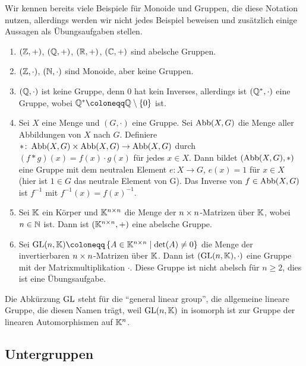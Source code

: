 {Wir kennen bereits viele Beispiele für Monoide und Gruppen, die diese Notation nutzen, allerdings werden wir nicht jedes Beispiel beweisen und zusätzlich einige Aussagen als Übungsaufgaben stellen.

\begin{example}
  \leavevmode \vspace{-\baselineskip}
  \begin{enumerate}
    \item $(\mathbb{Z},+)$, $(\mathbb{Q},+)$, $(\mathbb{R},+)$, $(\mathbb{C},+)$ sind abelsche Gruppen.
    \item $(\mathbb{Z},\cdot)$, $(\mathbb{N},\cdot)$ sind Monoide, aber keine Gruppen.
    \item $(\mathbb{Q},\cdot)$ ist keine Gruppe, denn $0$ hat kein Inverses, allerdings ist $(\mathbb{Q}^*,\cdot)$ eine Gruppe, wobei $\QQ^* \coloneqq \QQ \setminus \setdef{0}$ ist.
    \item Sei $X$ eine Menge und $(G,\cdot)$ eine Gruppe. Sei $\operatorname{Abb}(X,G)$ die Menge aller Abbildungen von $X$ nach $G$. Definiere $* \colon \operatorname{Abb}(X,G) \times \operatorname{Abb}(X,G) \rightarrow \operatorname{Abb}(X,G)$ durch $(f * g)(x) = f(x) \cdot g(x)$ für jedes $x \in X$.
    Dann bildet $(\operatorname{Abb}(X,G),*)$ eine Gruppe mit dem neutralen Element $e \colon X \rightarrow G$, $e(x) = 1$ für $x \in X$ (hier ist $1 \in G$ das neutrale Element von G). Das Inverse von $f \in \operatorname{Abb}(X,G)$ ist $f^{-1}$ mit $f^{-1}(x) = f(x)^{-1}$.
    \item Sei $\mathbb{K}$ ein Körper und $\mathbb{K}^{n \times n}$ die Menge der ${n \times n}$-Matrizen über $\mathbb{K}$, wobei $n \in \mathbb{N}$ ist. Dann ist $(\mathbb{K}^{n \times n},+)$ eine abelsche Gruppe.
    \item Sei $\GL(n,\KK) \coloneqq \left\{ A \in \KK^\nn \suchthat \det(A) \neq 0 \right\}$ die Menge der invertierbaren ${n \times n}$-Matrizen über $\mathbb{K}$. Dann ist $(\operatorname{GL}(n,\mathbb{K}),\cdot)$ eine Gruppe mit der Matrixmultiplikation $\cdot$. Diese Gruppe ist nicht abelsch für $n \geq 2$, dies ist eine Übungsaufgabe.
  \end{enumerate}
\end{example}

Die Abkürzung $\operatorname{GL}$ steht für die \enquote{general linear group}, die allgemeine lineare Gruppe, die diesen Namen trägt, weil $\operatorname{GL}(n,\mathbb{K})$ in isomorph ist zur Gruppe der linearen Automorphismen auf $\mathbb{K}^n$.

\subsection{Untergruppen}

}
